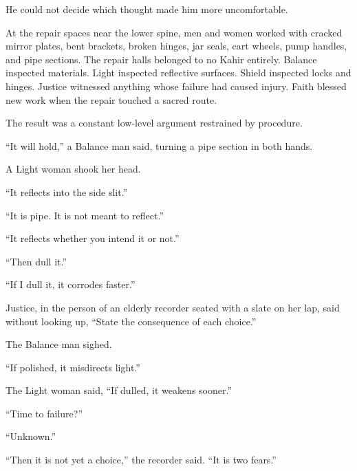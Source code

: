 He could not decide which thought made him more uncomfortable.\par

At the repair spaces near the lower spine, men and women worked with cracked mirror plates, bent brackets, broken hinges, jar seals, cart wheels, pump handles, and pipe sections.
The repair halls belonged to no Kahir entirely.
Balance inspected materials.
Light inspected reflective surfaces.
Shield inspected locks and hinges.
Justice witnessed anything whose failure had caused injury.
Faith blessed new work when the repair touched a sacred route.\par

The result was a constant low-level argument restrained by procedure.\par

“It will hold,” a Balance man said, turning a pipe section in both hands.\par

A Light woman shook her head.\par

“It reflects into the side slit.”\par

“It is pipe.
It is not meant to reflect.”\par

“It reflects whether you intend it or not.”\par

“Then dull it.”\par

“If I dull it, it corrodes faster.”\par

Justice, in the person of an elderly recorder seated with a slate on her lap, said without looking up, “State the consequence of each choice.”\par

The Balance man sighed.\par

“If polished, it misdirects light.”\par

The Light woman said, “If dulled, it weakens sooner.”\par

“Time to failure?”\par

“Unknown.”\par

“Then it is not yet a choice,” the recorder said.
“It is two fears.”\par

